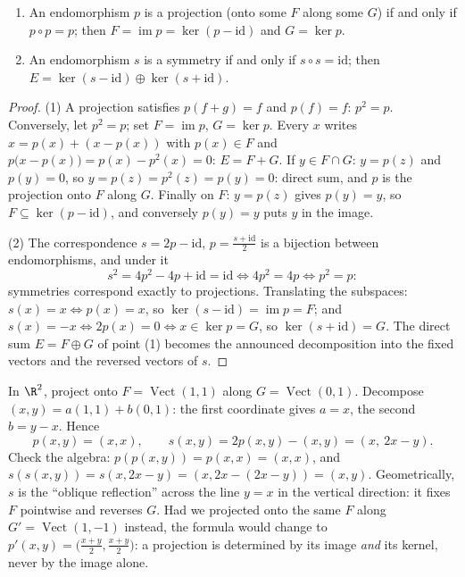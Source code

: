 \begin{theorem}\label{thm:b1:linmaps:projchar}
\begin{enumerate}
  \item An endomorphism $p$ is a projection (onto some $F$ along
        some $G$) if and only if $p \circ p = p$; then $F =
        \operatorname{im} p = \ker(p - \mathrm{id})$ and $G = \ker
        p$.
  \item An endomorphism $s$ is a symmetry if and only if $s \circ s
        = \mathrm{id}$; then $E = \ker(s - \mathrm{id}) \oplus
        \ker(s + \mathrm{id})$.
\end{enumerate}
\end{theorem}

\begin{proof}
(1) A projection satisfies $p(f + g) = f$ and $p(f) = f$: $p^2 = p$.
Conversely, let $p^2 = p$; set $F = \operatorname{im} p$, $G = \ker
p$. Every $x$ writes $x = p(x) + (x - p(x))$ with $p(x) \in F$ and
$p\bigl(x - p(x)\bigr) = p(x) - p^2(x) = 0$: $E = F + G$. If $y \in
F \cap G$: $y = p(z)$ and $p(y) = 0$, so $y = p(z) = p^2(z) = p(y) =
0$: direct sum, and $p$ is the projection onto $F$ along $G$.
Finally on $F$: $y = p(z)$ gives $p(y) = y$, so $F \subseteq
\ker(p - \mathrm{id})$, and conversely $p(y) = y$ puts $y$ in the
image.

(2) The correspondence $s = 2p - \mathrm{id}$, $p = \frac{s +
\mathrm{id}}2$ is a bijection between endomorphisms, and under it
\[
s^2 = 4p^2 - 4p + \mathrm{id} = \mathrm{id}
\iff 4p^2 = 4p \iff p^2 = p :
\]
symmetries correspond exactly to projections. Translating the
subspaces: $s(x) = x \iff p(x) = x$, so $\ker(s - \mathrm{id}) =
\operatorname{im} p = F$; and $s(x) = -x \iff 2p(x) = 0 \iff x
\in \ker p = G$, so $\ker(s + \mathrm{id}) = G$. The direct sum
$E = F \oplus G$ of point (1) becomes the announced decomposition
into the fixed vectors and the reversed vectors of $s$.
\end{proof}

\begin{example}
\label{ex:b1:linmaps:projexplicit}
In $\R^2$, project onto $F = \operatorname{Vect}(1,1)$ along $G =
\operatorname{Vect}(0,1)$. Decompose $(x, y) = a(1,1) + b(0,1)$:
the first coordinate gives $a = x$, the second $b = y - x$.
Hence
\[
p(x, y) = (x, x),
\qquad
s(x, y) = 2p(x,y) - (x,y) = (x,\ 2x - y).
\]
Check the algebra: $p(p(x,y)) = p(x,x) = (x,x)$, and $s(s(x,y)) =
s(x, 2x - y) = (x, 2x - (2x - y)) = (x, y)$. Geometrically, $s$
is the ``oblique reflection'' across the line $y = x$ in the
vertical direction: it fixes $F$ pointwise and reverses $G$. Had
we projected onto the same $F$ along $G' =
\operatorname{Vect}(1,-1)$ instead, the formula would change to
$p'(x,y) = \bigl(\frac{x+y}2, \frac{x+y}2\bigr)$: a projection is
determined by its image \emph{and} its kernel, never by the image
alone.
\end{example}

